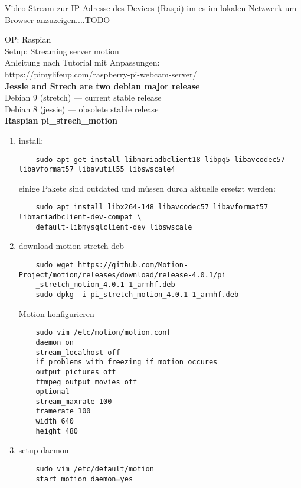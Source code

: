 Video Stream zur IP Adresse des Devices (Raspi) im es im lokalen 
Netzwerk um Browser anzuzeigen....TODO

OP: Raspian\\
Setup: Streaming server motion\\

Anleitung nach Tutorial mit Anpassungen:\\
https://pimylifeup.com/raspberry-pi-webcam-server/\\

\textbf{Jessie and Strech are two debian major release}\\
Debian 9 (stretch) — current stable release\\
Debian 8 (jessie) — obsolete stable release\\

\textbf{Raspian pi\_strech\_motion}

\begin{enumerate}
	\item install:
	\begin{verbatim}
	sudo apt-get install libmariadbclient18 libpq5 libavcodec57  libavformat57 libavutil55 libswscale4
	\end{verbatim}
	einige Pakete sind outdated und müssen durch aktuelle ersetzt werden:
	\begin{verbatim}	
	sudo apt install libx264-148 libavcodec57 libavformat57 libmariadbclient-dev-compat \	
	default-libmysqlclient-dev libswscale
	\end{verbatim}
	\item download motion stretch deb
	\begin{verbatim}
	sudo wget https://github.com/Motion-Project/motion/releases/download/release-4.0.1/pi
	_stretch_motion_4.0.1-1_armhf.deb
	sudo dpkg -i pi_stretch_motion_4.0.1-1_armhf.deb
	\end{verbatim}
	Motion konfigurieren
	\begin{verbatim}	
	sudo vim /etc/motion/motion.conf
	daemon on
	stream_localhost off
	if problems with freezing if motion occures
	output_pictures off
	ffmpeg_output_movies off
	optional
	stream_maxrate 100
	framerate 100
	width 640
	height 480
	\end{verbatim}
	
	\item setup daemon
	\begin{verbatim}
	sudo vim /etc/default/motion
	start_motion_daemon=yes
	\end{verbatim}
\end{enumerate}

